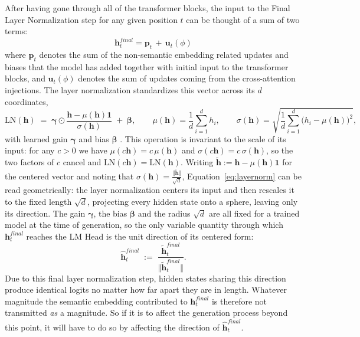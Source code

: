 \documentclass[titlepage,a4paper,11pt]{report}
\begin{document}
    After having gone through all of the transformer blocks, the input to the Final Layer Normalization step for any given position $t$ can be thought of a sum of two terms:
    \begin{equation}
        \bm h^{final}_t = \bm p_t \,+\, \bm u_t(\phi) 
    \end{equation}
    where $\bm p_t$ denotes the sum of the non-semantic embedding related updates and biases that the model has added together with initial input to the transformer blocks, and $\bm u_t(\phi)$ denotes the sum of updates coming from the cross-attention injections. The layer normalization standardizes this vector across its $d$ coordinates,
    \begin{equation}\label{eq:layernorm}
        \mathrm{LN}(\bm h) \;=\; \bm\gamma \odot \frac{\bm h - \mu(\bm h)\mathbf 1}{\sigma(\bm h)} \;+\; \bm\beta,
        \qquad
        \mu(\bm h) = \frac 1d \sum_{i=1}^{d} h_i,
        \qquad
        \sigma(\bm h) = \sqrt{\frac 1d \sum_{i=1}^{d} \bigl(h_i - \mu(\bm h)\bigr)^2},
    \end{equation}
    with learned gain $\bm\gamma$ and bias $\bm\beta$ \citep{ba_layer_2016}. This operation is invariant to the scale of its input: for any $c > 0$ we have $\mu(c\bm h) = c\,\mu(\bm h)$ and $\sigma(c\bm h) = c\,\sigma(\bm h)$, so the two factors of $c$ cancel and $\mathrm{LN}(c\bm h) = \mathrm{LN}(\bm h)$. Writing $\bm{\tilde h} := \bm h - \mu(\bm h)\mathbf 1$ for the centered vector and noting that $\sigma(\bm h) = \frac{\Vert\bm{\tilde h}\Vert}{\sqrt d}$, Equation~\eqref{eq:layernorm} can be read geometrically: the layer normalization centers its input and then rescales it to the fixed length $\sqrt d$, projecting every hidden state onto a sphere, leaving only its direction. The gain $\bm\gamma$, the bias $\bm\beta$ and the radius $\sqrt d$ are all fixed for a trained model at the time of generation, so the only variable quantity through which $\bm h^{final}_t$ reaches the LM Head is the unit direction of its centered form:
    \begin{equation}\label{eq:ln_direction}
        \bm{\hat h}^{final}_t \;:=\;  \frac{\bm{\tilde h}^{final}_t}{\bigl\Vert \bm{\tilde h}^{final}_t \bigr\Vert}.
    \end{equation}
    Due to this final layer normalization step, hidden states sharing this direction produce identical logits no matter how far apart they are in length. Whatever magnitude the semantic embedding contributed to $\bm h^{final}_t$ is therefore not transmitted \emph{as} a magnitude. So if it is to affect the generation process beyond this point, it will have to do so by affecting the direction of $\bm{\hat h}^{final}_t$. 
    
\end{document}
